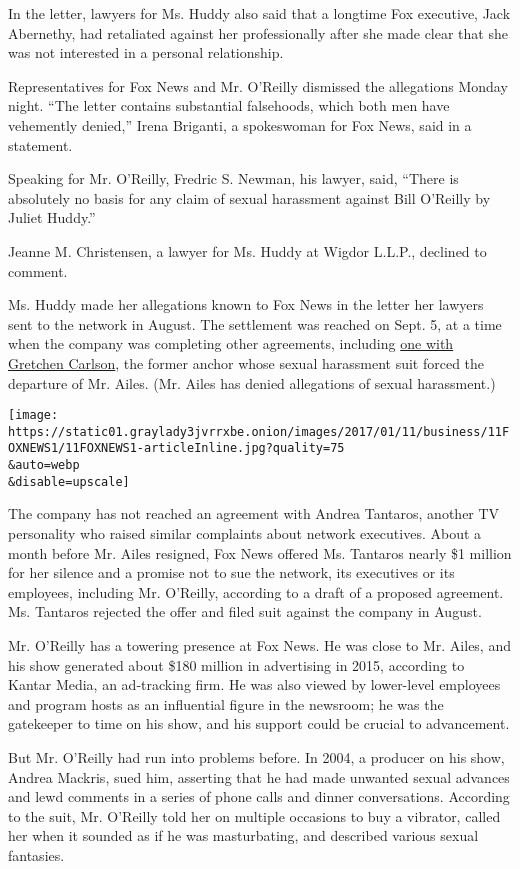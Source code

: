 In the letter, lawyers for Ms. Huddy also said that a longtime Fox
executive, Jack Abernethy, had retaliated against her professionally
after she made clear that she was not interested in a personal
relationship.

Representatives for Fox News and Mr. O'Reilly dismissed the allegations
Monday night. ``The letter contains substantial falsehoods, which both
men have vehemently denied,'' Irena Briganti, a spokeswoman for Fox
News, said in a statement.

Speaking for Mr. O'Reilly, Fredric S. Newman, his lawyer, said, ``There
is absolutely no basis for any claim of sexual harassment against Bill
O'Reilly by Juliet Huddy.''

Jeanne M. Christensen, a lawyer for Ms. Huddy at Wigdor L.L.P., declined
to comment.

Ms. Huddy made her allegations known to Fox News in the letter her
lawyers sent to the network in August. The settlement was reached on
Sept. 5, at a time when the company was completing other agreements,
including
\href{https://www.nytimes3xbfgragh.onion/2016/09/07/business/media/fox-news-roger-ailes-gretchen-carlson-sexual-harassment-lawsuit-settlement.html}{one
with Gretchen Carlson}, the former anchor whose sexual harassment suit
forced the departure of Mr. Ailes. (Mr. Ailes has denied allegations of
sexual harassment.)

\texttt{[image: https://static01.graylady3jvrrxbe.onion/images/2017/01/11/business/11FOXNEWS1/11FOXNEWS1-articleInline.jpg?quality=75\\\&auto=webp\\\&disable=upscale]}

The company has not reached an agreement with Andrea Tantaros, another
TV personality who raised similar complaints about network executives.
About a month before Mr. Ailes resigned, Fox News offered Ms. Tantaros
nearly \$1 million for her silence and a promise not to sue the network,
its executives or its employees, including Mr. O'Reilly, according to a
draft of a proposed agreement. Ms. Tantaros rejected the offer and filed
suit against the company in August.

Mr. O'Reilly has a towering presence at Fox News. He was close to Mr.
Ailes, and his show generated about \$180 million in advertising in
2015, according to Kantar Media, an ad-tracking firm. He was also viewed
by lower-level employees and program hosts as an influential figure in
the newsroom; he was the gatekeeper to time on his show, and his support
could be crucial to advancement.

But Mr. O'Reilly had run into problems before. In 2004, a producer on
his show, Andrea Mackris, sued him, asserting that he had made unwanted
sexual advances and lewd comments in a series of phone calls and dinner
conversations. According to the suit, Mr. O'Reilly told her on multiple
occasions to buy a vibrator, called her when it sounded as if he was
masturbating, and described various sexual fantasies.

